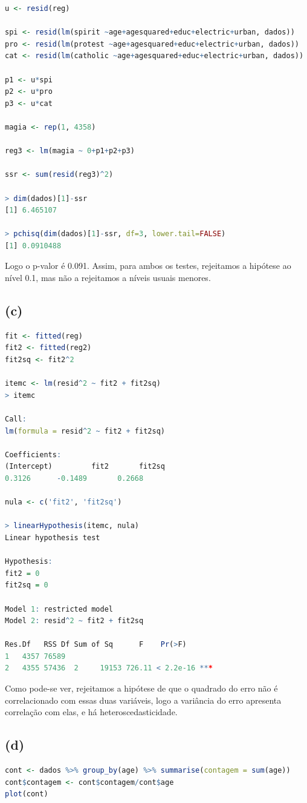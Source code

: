 \documentclass[12pt]{article}
\begin{document}
\begin{lstlisting}[language=R]
u <- resid(reg)

spi <- resid(lm(spirit ~age+agesquared+educ+electric+urban, dados))
pro <- resid(lm(protest ~age+agesquared+educ+electric+urban, dados))
cat <- resid(lm(catholic ~age+agesquared+educ+electric+urban, dados))

p1 <- u*spi
p2 <- u*pro
p3 <- u*cat

magia <- rep(1, 4358)

reg3 <- lm(magia ~ 0+p1+p2+p3)

ssr <- sum(resid(reg3)^2)

> dim(dados)[1]-ssr
[1] 6.465107

> pchisq(dim(dados)[1]-ssr, df=3, lower.tail=FALSE)
[1] 0.0910488
\end{lstlisting}
Logo o p-valor é 0.091. Assim, para ambos os testes, rejeitamos a hipótese ao nível 0.1, mas não a rejeitamos a níveis usuais menores.

\subsection*{(c)}
\begin{lstlisting}[language=R]
fit <- fitted(reg)
fit2 <- fitted(reg2)
fit2sq <- fit2^2

itemc <- lm(resid^2 ~ fit2 + fit2sq)
> itemc

Call:
lm(formula = resid^2 ~ fit2 + fit2sq)

Coefficients:
(Intercept)         fit2       fit2sq  
0.3126      -0.1489       0.2668  

nula <- c('fit2', 'fit2sq')

> linearHypothesis(itemc, nula)
Linear hypothesis test

Hypothesis:
fit2 = 0
fit2sq = 0

Model 1: restricted model
Model 2: resid^2 ~ fit2 + fit2sq

Res.Df   RSS Df Sum of Sq      F    Pr(>F)    
1   4357 76589                                  
2   4355 57436  2     19153 726.11 < 2.2e-16 ***
\end{lstlisting}
Como pode-se ver, rejeitamos a hipótese de que o quadrado do erro não é correlacionado com essas duas variáveis, logo a variância do erro apresenta correlação com elas, e há heteroscedasticidade. 

\subsection*{(d)}
\begin{lstlisting}[language=R]
cont <- dados %>% group_by(age) %>% summarise(contagem = sum(age))                                      
cont$contagem <- cont$contagem/cont$age
plot(cont)
\end{lstlisting}
\end{document}
